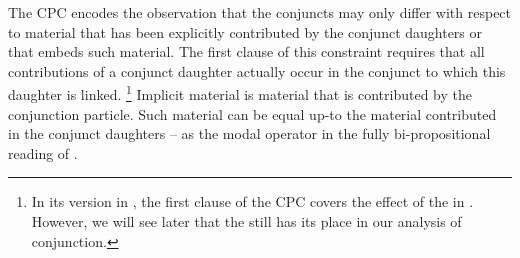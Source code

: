\documentclass[output=paper]{langsci/langscibook}
\begin{document}
The CPC encodes the observation that the conjuncts may only differ with respect to material that has been explicitly contributed by the conjunct daughters or that embeds such material.
The first clause of this constraint requires that all contributions of a conjunct daughter actually occur in the conjunct to which this daughter is linked.%
\footnote{In its version in , the first clause of the CPC covers the effect of the \CCB{} in . 
However, we will see later that 
the \CCB{} still has its place in our analysis of conjunction. 
}
Implicit material is material that is contributed by the conjunction particle.
Such material can be equal up-to the material contributed in the conjunct daughters -- as the modal operator in the fully bi-propositional reading of . 





\bigskip%
\end{document}
